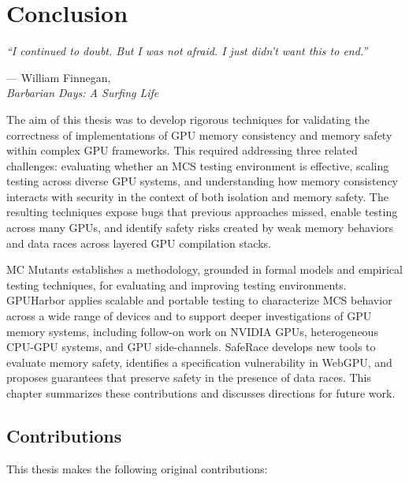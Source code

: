\chapter[Conclusion]{Conclusion}
\label{chap:conclusion}

\epigraph{\textit{``I continued to doubt. But I was not afraid. I just didn't want this to end.''}}{--- William Finnegan, \\\footnotesize\textit{Barbarian Days: A Surfing Life}}

The aim of this thesis was to develop rigorous techniques for validating the correctness of implementations of GPU memory consistency and memory safety within complex GPU frameworks. This required addressing three related challenges: evaluating whether an MCS testing environment is effective, scaling testing across diverse GPU systems, and understanding how memory consistency interacts with security in the context of both isolation and memory safety. The resulting techniques expose bugs that previous approaches missed, enable testing across many GPUs, and identify safety risks created by weak memory behaviors and data races across layered GPU compilation stacks.

MC Mutants establishes a methodology, grounded in formal models and empirical testing techniques, for evaluating and improving testing environments. GPUHarbor applies scalable and portable testing to characterize MCS behavior across a wide range of devices and to support deeper investigations of GPU memory systems, including follow-on work on NVIDIA GPUs, heterogeneous CPU-GPU systems, and GPU side-channels. SafeRace develops new tools to evaluate memory safety, identifies a specification vulnerability in WebGPU, and proposes guarantees that preserve safety in the presence of data races. This chapter summarizes these contributions and discusses directions for future work.

\section{Contributions}

This thesis makes the following original contributions:

